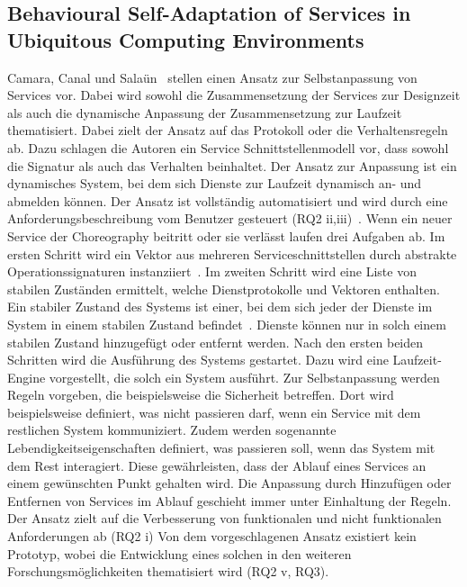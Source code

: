 \documentclass[conference,compsoc]{IEEEtran}
\begin{document}
\subsection{Behavioural Self-Adaptation of Services in Ubiquitous Computing Environments}
Camara, Canal und Salaün~\cite{camara2009behavioural} stellen einen Ansatz zur Selbstanpassung von Services vor. Dabei wird sowohl die Zusammensetzung der Services zur Designzeit als auch die dynamische Anpassung der Zusammensetzung zur Laufzeit thematisiert.
Dabei zielt der Ansatz auf das Protokoll oder die Verhaltensregeln ab. Dazu schlagen die Autoren ein Service Schnittstellenmodell vor, dass sowohl die Signatur als auch das Verhalten beinhaltet.
Der Ansatz zur Anpassung ist ein dynamisches System, bei dem sich Dienste zur Laufzeit dynamisch an- und abmelden können. Der Ansatz ist vollständig automatisiert und wird durch eine Anforderungsbeschreibung vom Benutzer gesteuert (RQ2 ii,iii)~\cite{camara2009behavioural}. Wenn ein neuer Service der Choreography beitritt oder sie verlässt laufen drei Aufgaben ab. Im ersten Schritt wird ein Vektor aus mehreren Serviceschnittstellen durch abstrakte Operationssignaturen instanziiert~\cite{camara2009behavioural}. Im zweiten Schritt wird eine Liste von stabilen Zuständen ermittelt, welche Dienstprotokolle und Vektoren enthalten. Ein stabiler Zustand des Systems ist einer, bei dem sich jeder der Dienste im System in einem stabilen Zustand befindet~\cite{camara2009behavioural}. Dienste können nur in solch einem stabilen Zustand hinzugefügt oder entfernt werden. Nach den ersten beiden Schritten wird die Ausführung des Systems gestartet. Dazu wird eine Laufzeit-Engine vorgestellt, die solch ein System ausführt.
Zur Selbstanpassung werden Regeln vorgeben, die beispielsweise die Sicherheit betreffen. Dort wird beispielsweise definiert, was nicht passieren darf, wenn ein Service mit dem restlichen System kommuniziert.
Zudem werden sogenannte Lebendigkeitseigenschaften definiert, was passieren soll, wenn das System mit dem Rest interagiert. Diese gewährleisten, dass der Ablauf eines Services an einem gewünschten Punkt gehalten wird. Die Anpassung durch Hinzufügen oder Entfernen von Services im Ablauf geschieht immer unter Einhaltung der Regeln.
Der Ansatz zielt auf die Verbesserung von funktionalen und nicht funktionalen Anforderungen ab (RQ2 i)
Von dem vorgeschlagenen Ansatz existiert kein Prototyp, wobei die Entwicklung eines solchen in den weiteren Forschungsmöglichkeiten thematisiert wird (RQ2 v, RQ3).
\end{document}
